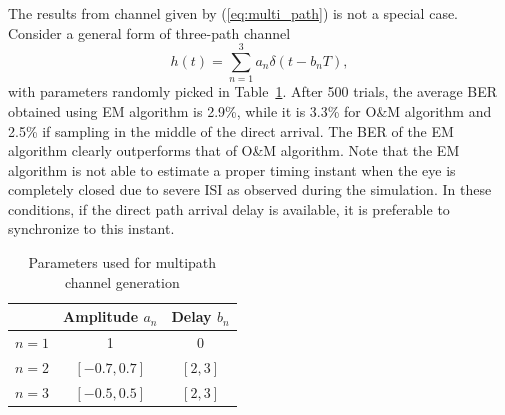 \documentclass[12pt, draftclsnofoot, onecolumn]{IEEEtran}
\begin{document}
The results from channel given by  (\ref{eq:multi_path}) is not a special case.
Consider a general form of three-path channel
\begin{equation}
h(t)=\sum\limits_{n = 1}^{3}{a_n\delta(t - b_n T)},
\label{eq:multi_path_2}
\end{equation}
with parameters randomly picked in Table~\ref{tb:multipath_para}.
After 500 trials, the average BER obtained using  EM algorithm is 2.9\%, while it is 3.3\% for O\&M algorithm and 2.5\% if sampling in the middle of the direct arrival.
The BER of the EM algorithm clearly outperforms that of O\&M algorithm.
Note that the EM algorithm is not able to estimate a proper timing instant when the eye is completely closed due to severe ISI as observed during the simulation.
In these conditions, if the direct path arrival delay is available, it is preferable to synchronize to this instant. 

\begin{table}[htbp]
\centering
\caption{Parameters used for multipath channel generation}
\label{tb:multipath_para}
\begin{tabular}{|l|c|c|}
\hline
      & Amplitude $a_n$ & Delay $b_n$ \\ \hline
$n=1$ & 1               & 0           \\ \hline
$n=2$ & $[-0.7, 0.7]$ & $[2, 3]$   \\ \hline
$n=3$ & $[-0.5, 0.5]$ & $[2, 3]$   \\ \hline
\end{tabular}
\end{table}

\end{document}
